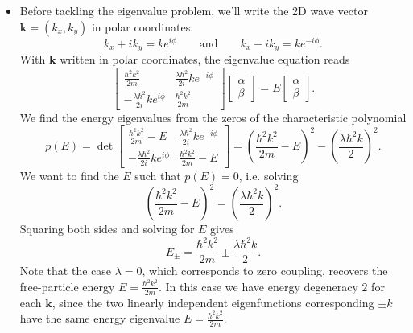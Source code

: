 \documentclass[11pt, a4paper]{article}
\newcommand{\eqtext}[1]{\qquad \text{#1} \qquad}
\renewcommand{\vec}[1]{\bm{#1}} %
\renewcommand{\k}{\vec{k}}  %
\begin{document}
\begin{itemize}
	\item Before tackling the eigenvalue problem, we'll write the 2D wave vector $ \vec{k} = (k_{x}, k_{y}) $ in polar coordinates:
	\begin{equation*}
		k_{x} + ik_{y} = ke^{i\phi} \eqtext{and} k_{x} - ik_{y} = ke^{-i\phi}.
	\end{equation*}
	With $ \k $ written in polar coordinates, the eigenvalue equation reads
	\begin{equation*}
		\begin{bmatrix}
		\frac{\hbar^{2}k^{2}}{2m} & \frac{\lambda \hbar^{2}}{2i}ke^{-i\phi} \\[1mm]
		-\frac{\lambda \hbar^{2}}{2i}ke^{i\phi} & \frac{\hbar^{2}k^{2}}{2m}
		\end{bmatrix}
		\begin{bmatrix}
			\alpha\\
			\beta
		\end{bmatrix}
		= E
		\begin{bmatrix}
			\alpha\\
			\beta
		\end{bmatrix}.
	\end{equation*}
	We find the energy eigenvalues from the zeros of the characteristic polynomial
	\begin{equation*}
		p(E) = \det 
		\begin{bmatrix}
		\frac{\hbar^{2}k^{2}}{2m} - E & \frac{\lambda \hbar^{2}}{2i}ke^{-i\phi} \\[1mm]
		-\frac{\lambda \hbar^{2}}{2i}ke^{i\phi} & \frac{\hbar^{2}k^{2}}{2m} - E
		\end{bmatrix}
		= \left( \frac{\hbar^{2}k^{2}}{2m} - E\right)^{2} - \left(\frac{\lambda \hbar^{2}k}{2}\right)^{2} .
	\end{equation*}	
	We want to find the $ E $ such that $ p(E) = 0 $, i.e. solving
	\begin{equation*}
		\left( \frac{\hbar^{2}k^{2}}{2m} - E\right)^{2} = \left(\frac{\lambda \hbar^{2}k}{2}\right)^{2} .
	\end{equation*}
	Squaring both sides and solving for $ E $ gives
	\begin{equation*}
		E_{\pm} = \frac{\hbar^{2}k^{2}}{2m} \pm \frac{\lambda \hbar^{2}k}{2}.
	\end{equation*}
	Note that the case $ \lambda = 0 $, which corresponds to zero coupling, recovers the free-particle energy $ E = \frac{\hbar^{2}k^{2}}{2m} $. In this case we have energy degeneracy $ 2 $ for each $ \k $, since the two linearly independent eigenfunctions corresponding $ \pm k $ have the same energy eigenvalue $ E = \frac{\hbar^{2}k^{2}}{2m} $.
	

\end{itemize}
\end{document}
